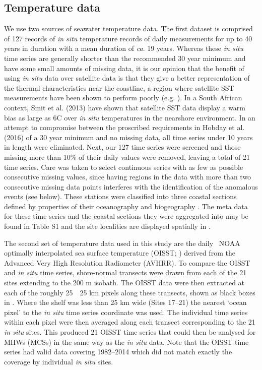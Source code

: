 \documentclass[a4paper,10pt,review]{elsarticle}
\begin{document}
\subsection{Temperature data}
We use two sources of seawater temperature data. The first dataset is comprised of 127 records of \emph{in situ} temperature records of daily measurements for up to 40 years in duration with a mean duration of \emph{ca}. 19 years. Whereas these \emph{in situ} time series are generally shorter than the recommended 30 year minimum \cite{Hobday2016} and have some small amounts of missing data, it is our opinion that the benefit of using \emph{in situ} data over satellite data is that they give a better representation of the thermal characteristics near the coastline, a region where satellite SST measurements have been shown to perform poorly (e.g. \cite{Smale2009, Castillo2010}). In a South African context, Smit et al. (2013) \cite{Smit2013} have shown that satellite SST data display a warm bias as large as 6\degree C over \emph{in situ} temperatures in the nearshore environment. In an attempt to compromise between the proscribed requirements in Hobday et al. (2016) \cite{Hobday2016} of a 30 year minimum and no missing data, all time series under 10 years in length were eliminated. Next, our 127 time series were screened and those missing more than 10\% of their daily values were removed, leaving a total of 21 time series. Care was taken to select continuous series with as few as possible consecutive missing values, since having regions in the data with more than two consecutive missing data points interferes with the identification of the anomalous events (see below). These stations were classified into three coastal sections defined by properties of their oceanography and biogeography \cite{Smit2013}. The meta data for these time series and the coastal sections they were aggregated into may be found in Table S1  and the site localities are displayed spatially in .

The second set of temperature data used in this study are the daily \degree~NOAA optimally interpolated sea surface temperature (OISST; \cite{Reynolds2007}) derived from the Advanced Very High Resolution Radiometer (AVHRR). To compare the OISST and \emph{in situ} time series, shore-normal transects were drawn from each of the 21 sites extending to the 200 m isobath. The OISST data were then extracted at each of the roughly 25~\texttimes~25 km pixels along these transects, shown as black boxes in . Where the shelf was less than 25 km wide (Sites 17--21) the nearest `ocean pixel' to the \emph{in situ} time series coordinate was used. The individual time series within each pixel were then averaged along each transect corresponding to the 21 \emph{in situ} sites. This produced 21 OISST time series that could then be analysed for MHWs (MCSs) in the same way as the \emph{in situ} data. Note that the OISST time series had valid data covering 1982--2014 which did not match exactly the coverage by individual \emph{in situ} sites.
\end{document}

